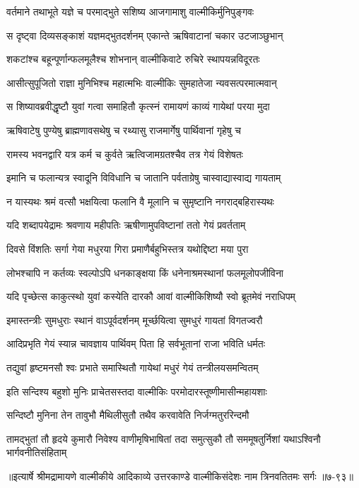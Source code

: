 
\twolineshloka
{वर्तमाने तथाभूते यज्ञे च परमाद्भुते}
{सशिष्य आजगामाशु वाल्मीकिर्मुनिपुङ्गवः} %

\twolineshloka
{स दृष्ट्वा दिव्यसङ्काशं यज्ञमद्भुतदर्शनम्}
{एकान्ते ऋषिवाटानां चकार उटजाञ्छुभान्} %

\twolineshloka
{शकटांश्च बहून्पूर्णान्फलमूलैश्च शोभनान्}
{वाल्मीकिवाटे रुचिरे स्थापयन्नविदूरतः} %

\twolineshloka
{आसीत्सुपूजितो राज्ञा मुनिभिश्च महात्मभिः}
{वाल्मीकिः सुमहातेजा न्यवसत्परमात्मवान्} %

\twolineshloka
{स शिष्यावब्रवीद्धृष्टौ युवां गत्वा समाहितौ}
{कृत्स्नं रामायणं काव्यं गायेथां परया मुदा} %

\twolineshloka
{ऋषिवाटेषु पुण्येषु ब्राह्मणावसथेषु च}
{रथ्यासु राजमार्गेषु पार्थिवानां गृहेषु च} %

\twolineshloka
{रामस्य भवनद्वारि यत्र कर्म च कुर्वते}
{ऋत्विजामग्रतश्चैव तत्र गेयं विशेषतः} %

\twolineshloka
{इमानि च फलान्यत्र स्वादूनि विविधानि च}
{जातानि पर्वताग्रेषु चास्वाद्यास्वाद्य गायताम्} %

\twolineshloka
{न यास्यथः श्रमं वत्सौ भक्षयित्वा फलानि वै}
{मूलानि च सुमृष्टानि नगराद्बहिरास्यथः} %

\twolineshloka
{यदि शब्दापयेद्रामः श्रवणाय महीपतिः}
{ऋषीणामुपविष्टानां ततो गेयं प्रवर्तताम्} %

\twolineshloka
{दिवसे विंशतिः सर्गा गेया मधुरया गिरा}
{प्रमाणैर्बहुभिस्तत्र यथोद्दिष्टा मया पुरा} %

\twolineshloka
{लोभश्चापि न कर्तव्यः स्वल्पोऽपि धनकाङ्क्षया}
{किं धनेनाश्रमस्थानां फलमूलोपजीविना} %

\twolineshloka
{यदि पृच्छेत्स काकुत्स्थो युवां कस्येति दारकौ}
{आवां वाल्मीकिशिष्यौ स्वो ब्रूतमेवं नराधिपम्} %

\twolineshloka
{इमास्तन्त्रीः सुमधुराः स्थानं वाऽपूर्वदर्शनम्}
{मूर्च्छयित्वा सुमधुरं गायतां विगतज्वरौ} %

\twolineshloka
{आदिप्रभृति गेयं स्यान्न चावज्ञाय पार्थिवम्}
{पिता हि सर्वभूतानां राजा भविति धर्मतः} %

\twolineshloka
{तद्युवां हृष्टमनसौ श्वः प्रभाते समास्थितौ}
{गायेथां मधुरं गेयं तन्त्रीलयसमन्वितम्} %

\twolineshloka
{इति सन्दिश्य बहुशो मुनिः प्राचेतसस्तदा}
{वाल्मीकिः परमोदारस्तूष्णीमासीन्महायशाः} %

\twolineshloka
{सन्दिष्टौ मुनिना तेन तावुभौ मैथिलीसुतौ}
{तथैव करवावेति निर्जग्मतुररिन्दमौ} %

\twolineshloka
{तामद्भुतां तौ हृदये कुमारौ निवेश्य वाणीमृषिभाषितां तदा}
{समुत्सुकौ तौ सममूषतुर्निशां यथाऽश्विनौ भार्गवनीतिसंहिताम्} %


॥इत्यार्षे श्रीमद्रामायणे वाल्मीकीये आदिकाव्ये उत्तरकाण्डे वाल्मीकिसंदेशः नाम त्रिनवतितमः सर्गः ॥७-९३॥
